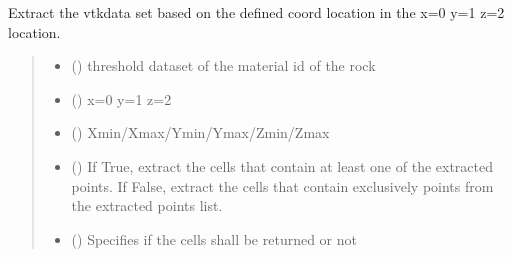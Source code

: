 \documentclass[letterpaper,10pt,english]{sphinxmanual}
\begin{document}
\begin{fulllineitems}
\begin{fulllineitems}
\end{fulllineitems}


\begin{fulllineitems}
\label{\detokenize{pyfdempp:pyfdempp.pyfdempp.Model.extract_based_coord}}
\pysigstartsignatures
{}
\pysigstopsignatures
\sphinxAtStartPar
Extract the vtkdata set based on the defined coord location in the x=0 y=1 z=2 location.
\begin{quote}\begin{description}
\begin{itemize}
\item {} 
\sphinxAtStartPar
{} () \textendash{} threshold dataset of the material id of the rock

\item {} 
\sphinxAtStartPar
{} () \textendash{} x=0 y=1 z=2

\item {} 
\sphinxAtStartPar
{} () \textendash{} Xmin/Xmax/Ymin/Ymax/Zmin/Zmax

\item {} 
\sphinxAtStartPar
{} () \textendash{} If True, extract the cells that contain at least one of the extracted points. If False, extract the cells that contain exclusively points from the extracted points list.

\item {} 
\sphinxAtStartPar
{} () \textendash{} Specifies if the cells shall be returned or not


\end{itemize}
\end{description}
\end{quote}
\end{fulllineitems}
\end{fulllineitems}
\end{document}
